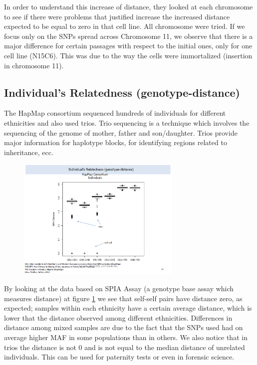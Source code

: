 In order to understand this increase of distance, they looked at each chromosome to see if there were problems that justified increase the increased distance expected to be equal to zero in that cell line. All chromosome were tried. If we focus only on the SNPs spread across Chromosome 11, we observe that there is a major difference for certain passages with respect to the initial ones, only for one cell line (N15C6). This was due to the way the cells were immortalized (insertion in chromosome 11).


\subsection*{Individual's Relatedness (genotype-distance)}

The HapMap consortium sequenced hundreds of individuals for different ethnicities and also used trios. Trio sequencing is a technique which involves the sequencing of the genome of mother, father and son/daughter. Trios provide major information for haplotype blocks, for identifying regions related to inheritance, ecc. 

\begin{figure}
	\centering
	\includegraphics[width = 0.7\textwidth]{Images/trios.PNG}
	\caption{\label{fig: trios}}
\end{figure}

By looking at the data based on SPIA Assay (a genotype base assay which measures distance) at figure \ref*{fig: trios} we see that self-self pairs have distance zero, as expected; samples within each ethnicity have a certain average distance, which is lower that the distance observed among different ethnicities. Differences in distance among mixed samples are due to the fact that the SNPs used had on average higher MAF in some populations than in others. We also notice that in trios the distance is not 0 and is not equal to the median distance of unrelated individuals. This can be used for paternity tests or even in forensic science.

